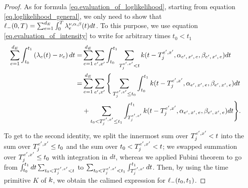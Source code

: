 \documentclass[10pt]{article}
\begin{document}
\begin{proof}
As for formula \eqref{eq.evaluation_of_loglikelihood}, starting from equation \eqref{eq.loglikelihood_general}, we only need to show that $\lminus(0,\timeHorizon) = \sum_{e=1}^{\numEventTypes} \int_{0}^{\timeHorizon}\intensity^{\nu,\impCoef, \decCoef}(t)dt$. To this purpose, we use equation \eqref{eq.evaluation_of_intensity} to write for arbitrary times $t_0<t_1$
\begin{equation*}
\begin{split}
\sum_{e=1}^{\numEventTypes}\int_{t_0}^{t_1} \left(\intensity[e](t) - \baseRate_e \right) dt 
=&
\sum_{e=1}^{\numEventTypes}\sum_{\eone,\xone}\int_{t_0}^{t_1} 
\sum_{\arrivalTimes[\eone,\xone]_j <t} \parametricHawkesKernel(t-\arrivalTimes[\eone,\xone]_j, \impCoef\subscriptexe, \decCoef\subscriptexe)dt 
\\
=&
\sum_{e=1}^{\numEventTypes}\sum_{\eone,\xone}
\Bigg\lbrace
\sum_{\arrivalTimes[\eone,\xone]_j \leq t_0}
\int_{t_0}^{t_1} 
\parametricHawkesKernel(t-\arrivalTimes[\eone,\xone]_j, \impCoef\subscriptexe, \decCoef\subscriptexe)dt 
\\
&+
\sum_{t_0<\arrivalTimes[\eone,\xone]_j \leq t_1}
\int_{\arrivalTimes[\eone,\xone]_j}^{t_1} \parametricHawkesKernel(t-\arrivalTimes[\eone,\xone]_j, \impCoef\subscriptexe, \decCoef\subscriptexe)dt 
\Bigg\rbrace.
\end{split}
\end{equation*}
To get to the second identity, we split the innermost sum over $\arrivalTimes[\eone,\xone]_j<t$ into the sum over $\arrivalTimes[\eone,\xone]_j \leq t_0$ and the sum over $t_0 < \arrivalTimes[\eone,\xone]_j<t$;  we swapped summation over  $\arrivalTimes[\eone,\xone]_j \leq t_0$ with integration in $dt$, whereas we applied Fubini theorem to go from $\int_{t_0}^{t_1}dt\sum_{t_0 < \arrivalTimes[\eone,\xone]_j<t}$ to $\sum_{t_0 < \arrivalTimes[\eone,\xone]_j<t_1}\int_{\arrivalTimes[\eone,\xone]_j}^{t_1}dt$. Then, by using the time primitive $K$ of $\parametricHawkesKernel$, we obtain the calimed expression for $\lminus(t_0,t_1)$.
\end{proof}
\end{document}
